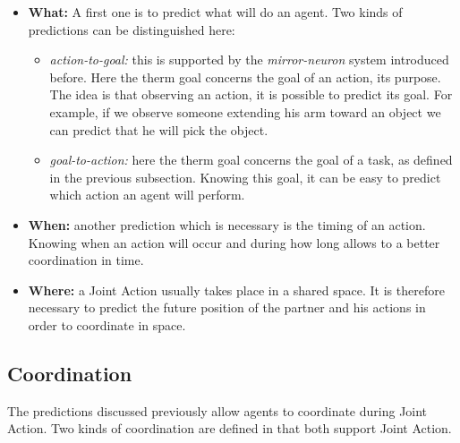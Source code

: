 \documentclass[english,a4paper,11pt,twoside]{StyleThese}
\begin{document}
\begin{itemize}
\item \textbf{What:} A first one is to predict what will do an agent. Two kinds of predictions can be distinguished here:
\begin{itemize}
\item \textit{action-to-goal:} this is supported by the \textit{mirror-neuron} system introduced before. Here the therm goal concerns the goal of an action, its purpose. The idea is that observing an action, it is possible to predict its goal. For example, if we observe someone extending his arm toward an object we can predict that he will pick the object.
\item \textit{goal-to-action:} here the therm goal concerns the goal of a task, as defined in the previous subsection. Knowing this goal, it can be easy to predict which action an agent will perform.
\end{itemize}
\item \textbf{When:} another prediction which is necessary is the timing of an action. Knowing when an action will occur and during how long allows to a better coordination in time.
\item \textbf{Where:} a Joint Action usually takes place in a shared space. It is therefore necessary to predict the future position of the partner and his actions in order to coordinate in space.
\end{itemize} 


\subsection{Coordination}

\label{subsec:coordination}

The predictions discussed previously allow agents to coordinate during Joint Action. Two kinds of coordination are defined in \cite{knoblich20113} that both support Joint Action.
\end{document}
